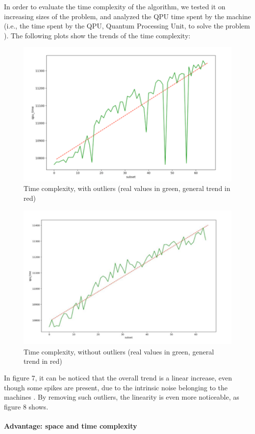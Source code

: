 \documentclass[oneside,a4paper]{article}
\begin{document}
In order to evaluate the time complexity of the algorithm, we tested it on increasing sizes of the problem, and analyzed the QPU time spent by the machine (i.e., the time spent by the QPU, Quantum Processing Unit, to solve the problem \cite{WebSite13}). The following plots show the trends of the time complexity:
\begin{figure}[htp]
\centering
\includegraphics[width=15cm]{LaTeXTemplate/Images/2000QfirstT1.png}
\caption{Time complexity, with outliers (real values in green, general trend in red)}
\end{figure}
\begin{figure}[htp]
\centering
\includegraphics[width=15cm]{LaTeXTemplate/Images/2000QfirstT2.png}
\caption{Time complexity, without outliers (real values in green, general trend in red)}
\end{figure}

In figure 7, it can be noticed that the overall trend is a linear increase, even though some spikes are present, due to the intrinsic noise belonging to the machines \cite{WebSite14}. By removing such outliers, the linearity is even more noticeable, as figure 8 shows.
\\
\\
\textbf{Advantage: space and time complexity} \\
\end{document}
